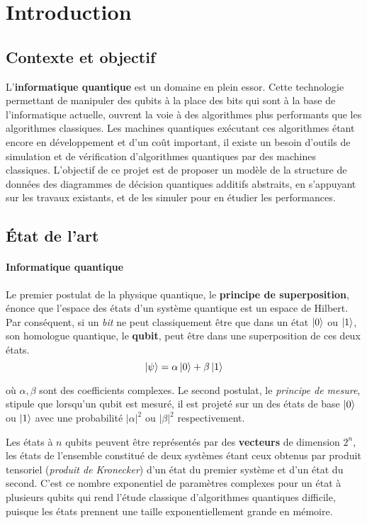\chapter{Introduction} %
\label{ch:Introduction}


\section{Contexte et objectif}
\label{sec:Contexte}

L'\textbf{informatique quantique} est un domaine en plein essor. Cette technologie permettant de manipuler des qubits à la place des bits qui sont à la base de l'informatique actuelle, ouvrent la voie à des algorithmes plus performants que les algorithmes classiques. Les machines quantiques exécutant ces algorithmes étant encore en développement et d'un coût important, il existe un besoin d'outils de simulation et de vérification d'algorithmes quantiques par des machines classiques. L'objectif de ce projet est de proposer un modèle de la structure de données des diagrammes de décision quantiques additifs abstraits, en s'appuyant sur les travaux existants, et de les simuler pour en étudier les performances.


\section{État de l’art}
\label{sec:Etat}


\subsubsection*{Informatique quantique}

Le premier postulat de la physique quantique, le \textbf{principe de superposition}, énonce que l'espace des états d'un système quantique est un espace de Hilbert. Par conséquent, si un \textit{bit} ne peut classiquement être que dans un état $\ket 0$ ou $\ket 1$, son homologue quantique, le \textbf{qubit}, peut être dans une superposition de ces deux états.
$$\ket \psi = \alpha \ket 0 + \beta \ket 1$$

\noindent où $\alpha, \beta$ sont des coefficients complexes. Le second postulat, le \textit{principe de mesure}, stipule que lorsqu'un qubit est mesuré, il est projeté sur un des états de base $\ket 0$ ou $\ket 1$ avec une probabilité $|\alpha|^2$ ou $|\beta|^2$ respectivement.

Les états à $n$ qubits peuvent être représentés par des \textbf{vecteurs} de dimension $2^n$, les états de l'ensemble constitué de deux systèmes étant ceux obtenus par produit tensoriel (\textit{produit de Kronecker}) d'un état du premier système et d'un état du second. C'est ce nombre exponentiel de paramètres complexes pour un état à plusieurs qubits qui rend l'étude classique d'algorithmes quantiques difficile, puisque les états prennent une taille exponentiellement grande en mémoire.

